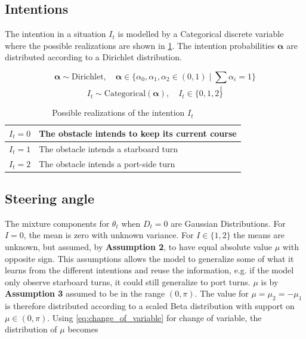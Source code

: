 \subsection{Intentions}
The intention in a situation $I_t$ is modelled by a Categorical discrete variable where the possible realizations are shown in \cref{tbl:intentions}. The intention probabilities $\boldsymbol{\alpha}$ are distributed according to a Dirichlet distribution.

\begin{equation}
    \boldsymbol{\alpha} \sim \text{Dirichlet}, \quad \boldsymbol{\alpha} \in \{\alpha_0, \alpha_1, \alpha_2 \in (0, 1) \; | \; \sum_i \alpha_i = 1 \}
\end{equation}
\begin{equation}
    I_t \sim \text{Categorical}(\boldsymbol{\alpha}), \quad I_t \in \{0, 1, 2\}
\end{equation}

\begin{table}[h]
\centering
\begin{tabular}{|l|l|}
\hline
$I_t=0$ & The obstacle intends to keep its current course \\ \hline
$I_t=1$ & The obstacle intends a starboard turn           \\ \hline
$I_t=2$ & The obstacle intends a port-side turn            \\ \hline
\end{tabular}
\caption{Possible realizations of the intention $I_t$}
\label{tbl:intentions}
\end{table}

\subsection{Steering angle}
The mixture components for $\theta_t$ when $D_t=0$ are Gaussian Distributions. For $I=0$, the mean is zero with unknown variance. For $I \in \{1, 2\}$ the means are unknown, but assumed, by \textbf{Assumption 2}, to have equal absolute value $\mu$ with opposite sign. This assumptions allows the model to generalize some of what it learns from the different intentions and reuse the information, e.g. if the model only observe starboard turns, it could still generalize to port turns.  $\mu$ is by \textbf{Assumption 3} assumed to be in the range $(0, \pi)$. The value for $\mu = \mu_2 = -\mu_1$ is therefore distributed according to a scaled Beta distribution with support on $\mu \in (0, \pi)$.  Using \cref{eq:change_of_variable} for change of variable, the distribution of $\mu$ becomes 


